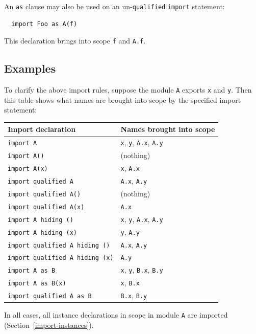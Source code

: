 An \mbox{\tt as} clause may also be used on an un-\mbox{\tt qualified} \mbox{\tt import} statement:
\bprog
{\small\begin{verbatim}
  import Foo as A(f)
\end{verbatim}}
\eprog
This declaration brings into scope \mbox{\tt f} and \mbox{\tt A.f}.


\subsection{Examples}

To clarify the above import rules, suppose the module \mbox{\tt A} exports \mbox{\tt x} and \mbox{\tt y}.
Then this table shows what names are brought into scope by the specified import statement:
\begin{center}
\begin{tabular}{|ll|}
\hline
Import declaration & Names brought into scope \\
\hline
  \mbox{\tt import\ A}                    & \mbox{\tt x}, \mbox{\tt y}, \mbox{\tt A.x}, \mbox{\tt A.y} \\
  \mbox{\tt import\ A()}                  & (nothing)     \\
  \mbox{\tt import\ A(x)}                 & \mbox{\tt x}, \mbox{\tt A.x} \\
  \mbox{\tt import\ qualified\ A}          & \mbox{\tt A.x}, \mbox{\tt A.y} \\
  \mbox{\tt import\ qualified\ A()}        & (nothing) \\
  \mbox{\tt import\ qualified\ A(x)}       & \mbox{\tt A.x} \\
  \mbox{\tt import\ A\ hiding\ ()}          & \mbox{\tt x}, \mbox{\tt y}, \mbox{\tt A.x}, \mbox{\tt A.y} \\
  \mbox{\tt import\ A\ hiding\ (x)}         & \mbox{\tt y}, \mbox{\tt A.y} \\
  \mbox{\tt import\ qualified\ A\ hiding\ ()}        & \mbox{\tt A.x}, \mbox{\tt A.y} \\
  \mbox{\tt import\ qualified\ A\ hiding\ (x)}       & \mbox{\tt A.y} \\
  \mbox{\tt import\ A\ as\ B}               & \mbox{\tt x}, \mbox{\tt y}, \mbox{\tt B.x}, \mbox{\tt B.y} \\
  \mbox{\tt import\ A\ as\ B(x)}            & \mbox{\tt x}, \mbox{\tt B.x} \\
  \mbox{\tt import\ qualified\ A\ as\ B}     & \mbox{\tt B.x}, \mbox{\tt B.y} \\
\hline
\end{tabular}
\end{center}
In all cases, all instance declarations in scope in module \mbox{\tt A} are imported
(Section~\ref{import-instances}).

